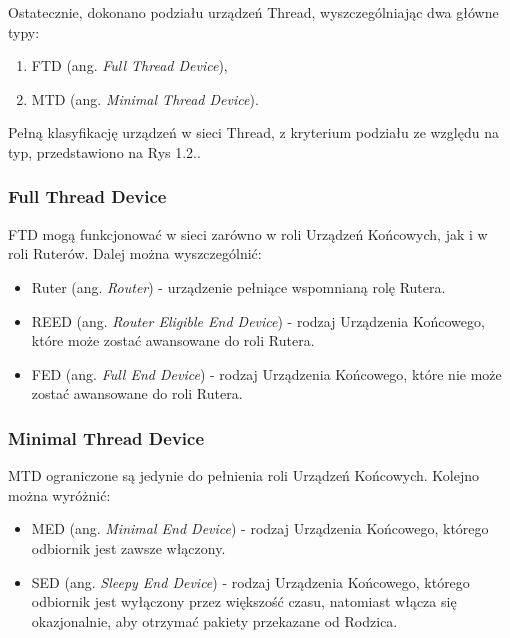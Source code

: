         Ostatecznie, dokonano podziału urządzeń Thread, wyszczególniając dwa główne typy:
        \begin{enumerate}
            \item FTD (ang. \textit{Full Thread Device}),
            \item MTD (ang. \textit{Minimal Thread Device}).
        \end{enumerate}

        Pełną klasyfikację urządzeń w sieci Thread, z kryterium podziału ze względu na typ, przedstawiono na Rys 1.2..

        \subsubsection{Full Thread Device}

            FTD mogą funkcjonować w sieci zarówno w roli Urządzeń Końcowych, jak i w roli Ruterów. Dalej można wyszczególnić: 
            \begin{itemize}
                \item Ruter (ang. \textit{Router}) - urządzenie pełniące wspomnianą rolę Rutera.
                \item REED (ang. \textit{Router Eligible End Device}) - rodzaj Urządzenia Końcowego, które może zostać awansowane do roli Rutera.
                \item FED (ang. \textit{Full End Device}) - rodzaj Urządzenia Końcowego, które nie może zostać awansowane do roli Rutera.
            \end{itemize}
        
        \subsubsection{Minimal Thread Device}

            MTD ograniczone są jedynie do pełnienia roli Urządzeń Końcowych. Kolejno można wyróżnić:
            \begin{itemize}
                \item MED (ang. \textit{Minimal End Device}) - rodzaj Urządzenia Końcowego, którego odbiornik jest zawsze włączony.
                \item SED (ang. \textit{Sleepy End Device}) - rodzaj Urządzenia Końcowego, którego odbiornik jest wyłączony przez większość czasu, natomiast włącza się okazjonalnie, aby otrzymać pakiety przekazane od Rodzica.
            \end{itemize}

